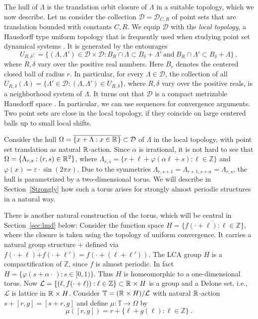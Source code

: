 \documentclass[11pt, a4wide]{amsart}
\newcommand{\ts}{\hspace{0.5pt}}
\newcommand{\RR}{\mathbb{R}\ts}
\newcommand{\ZZ}{\mathbb{Z}}
\newcommand{\TT}{\mathbb{T}}
\newcommand{\LL}{\mathcal{L}}
\numberwithin{lemma}{section}
\begin{document}
The hull of $\Lambda$ is the translation orbit closure of $\Lambda$ in a suitable topology, which we now describe.
Let us consider the collection $\mathcal D=\mathcal D_{C,R}$ of point sets that are translation bounded with constants $C,R$. We equip $\mathcal D$ with the \textit{local topology}, a Hausdorff type uniform topology that is frequently used when studying point set dynamical systems \cite[Sec.~4]{BL}. It is generated by the entourages
%
\[
U_{R, \delta} : = \{(\Lambda, \Lambda') \in \mathcal{D} \times \mathcal{D} : B_R \cap \Lambda \subset B_{\delta} + \Lambda'
\ \mbox{and} \ B_R \cap \Lambda' \subset B_{\delta} + \Lambda \}\,,
\]
%
where $R, \delta$ vary over the positive real numbers. Here $B_r$ denotes the centered closed ball of radius $r$.
In particular, for every $\Lambda\in\mathcal D$, the collection of all
%
$U_{R, \delta}(\Lambda) = \{\Lambda' \in \mathcal{D} : (\Lambda, \Lambda') \in U_{R, \delta}\}$,
%
where $R,\delta$ vary over the positive reals, is a neighborhood system of $\Lambda$. It turns out that $\mathcal D$ is a compact metrizable Hausdorff space \cite[Thm.~3]{BL}. In particular, we can use sequences for convergence arguments. Two point sets are close in the local topology, if they coincide on large centered balls up to small local shifts.

\smallskip

Consider the hull $\Omega = \overline{\{x + \Lambda : x \in \RR\}}\subset \mathcal D$
of $\Lambda$ in the local topology, with point set translation as natural $\RR$-action. Since $\alpha$ is irrational, it is not hard to see that $\Omega=\{\Lambda_{r,s}: (r,s)\in \RR^2\}$, where $\Lambda_{r,s}=\{r+\ell+\varphi(\alpha\ell+s):\ell\in \ZZ\}$ and $\varphi(x)=\varepsilon\cdot \sin(2\pi x)$. Due to the symmetries $\Lambda_{r,s+1}=\Lambda_{r+1,s+\alpha}=\Lambda_{r,s}$, the hull is parametrized by a two-dimensional torus. We will describe in Section~\ref{Strongly} how such a torus arises for strongly almost periodic structures in a natural way.

\smallskip

There is another natural construction of the torus, which will be central in Section~\ref{sec:lmd} below:
Consider the function space $H=\overline{\{f(\cdot+ \ell): \ell \in \ZZ\}}$, where the closure is taken using the topology of uniform convergence. It carries a natural group structure $\dot{+}$ defined via $f(\cdot + \ell) \dot{+} f(\cdot + \ell')=f(\cdot + (\ell+\ell'))$.
The LCA group $H$ is a compactification of $\ZZ$, since $f$ is almost periodic.
In fact $H=\{\varphi(s+\alpha \cdot \, ): s\in [0,1)\}$. Thus $H$ is homeomorphic to a one-dimensional torus. 
Now $\LL=\{(\ell, f(\cdot+\ell)): \ell \in \ZZ\}\subset \RR\times H$
is a group and a Delone set, i.e., $\LL$ is lattice in $\RR\times H$.
Consider $\TT=(\RR \times H) / \LL$ with natural $\RR$-action
$s+[r,g]=[s+r, g]$ and define $\mu: \TT \to \Omega$ by
%
\begin{displaymath}
\mu([r,g]) = r + \{\ell+g(\ell):\ell \in \ZZ\} \ .
\end{displaymath}
%
\end{document}
